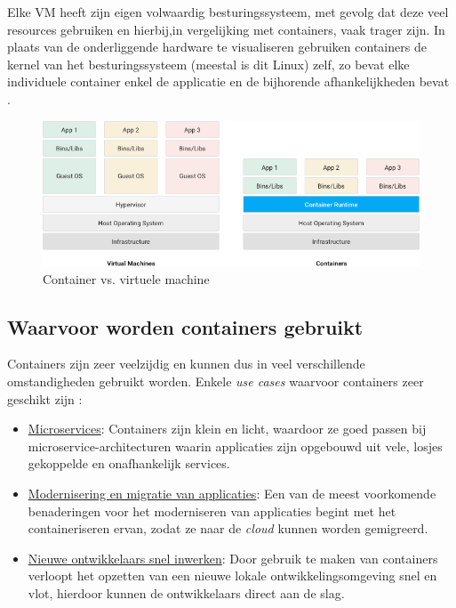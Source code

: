 Elke VM heeft zijn eigen volwaardig besturingssysteem, met gevolg dat deze veel resources gebruiken en hierbij,in vergelijking met containers, vaak trager zijn. In plaats van de onderliggende hardware te visualiseren gebruiken containers de kernel van het besturingssysteem (meestal is dit Linux) zelf, zo bevat elke individuele container enkel de applicatie en de bijhorende afhankelijkheden bevat \autocite{Education2020}.

\begin{figure}[ht]
    \centering
    \includegraphics[width=\linewidth]{img/container-vs-vm.png}
    \caption{Container vs. virtuele machine \autocite{Google2016}}
    \label{fig:example}
\end{figure}


\subsection{Waarvoor worden containers gebruikt}
Containers zijn zeer veelzijdig en kunnen dus in veel verschillende omstandigheden gebruikt worden. Enkele \textit{use cases} waarvoor containers zeer geschikt zijn \autocite{Docker2021}:

\begin{itemize}
  \item \underline{Microservices}: Containers zijn klein en licht, waardoor ze goed passen bij microservice-architecturen waarin applicaties zijn opgebouwd uit vele, losjes gekoppelde en onafhankelijk services.
  \item \underline{Modernisering en migratie van applicaties}: Een van de meest voorkomende benaderingen voor het moderniseren van applicaties begint met het containeriseren ervan, zodat ze naar de \textit{cloud} kunnen worden gemigreerd.
  \item \underline{Nieuwe ontwikkelaars snel inwerken}: Door gebruik te maken van containers verloopt het opzetten van een nieuwe lokale ontwikkelingsomgeving snel en vlot, hierdoor kunnen de ontwikkelaars direct aan de slag.
\end{itemize}


